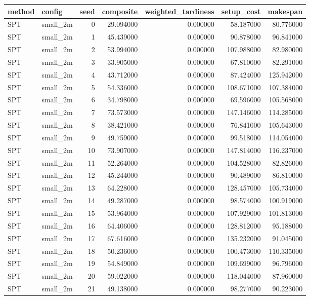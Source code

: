 \begin{tabular}{llrrrrr}
\toprule
method & config & seed & composite & weighted_tardiness & setup_cost & makespan \\
\midrule
SPT & small_2m & 0 & 29.094000 & 0.000000 & 58.187000 & 80.776000 \\
SPT & small_2m & 1 & 45.439000 & 0.000000 & 90.878000 & 96.841000 \\
SPT & small_2m & 2 & 53.994000 & 0.000000 & 107.988000 & 82.980000 \\
SPT & small_2m & 3 & 33.905000 & 0.000000 & 67.810000 & 82.291000 \\
SPT & small_2m & 4 & 43.712000 & 0.000000 & 87.424000 & 125.942000 \\
SPT & small_2m & 5 & 54.336000 & 0.000000 & 108.671000 & 107.384000 \\
SPT & small_2m & 6 & 34.798000 & 0.000000 & 69.596000 & 105.568000 \\
SPT & small_2m & 7 & 73.573000 & 0.000000 & 147.146000 & 114.285000 \\
SPT & small_2m & 8 & 38.421000 & 0.000000 & 76.841000 & 105.643000 \\
SPT & small_2m & 9 & 49.759000 & 0.000000 & 99.518000 & 114.054000 \\
SPT & small_2m & 10 & 73.907000 & 0.000000 & 147.814000 & 116.237000 \\
SPT & small_2m & 11 & 52.264000 & 0.000000 & 104.528000 & 82.826000 \\
SPT & small_2m & 12 & 45.244000 & 0.000000 & 90.489000 & 86.810000 \\
SPT & small_2m & 13 & 64.228000 & 0.000000 & 128.457000 & 105.734000 \\
SPT & small_2m & 14 & 49.287000 & 0.000000 & 98.574000 & 100.919000 \\
SPT & small_2m & 15 & 53.964000 & 0.000000 & 107.929000 & 101.813000 \\
SPT & small_2m & 16 & 64.406000 & 0.000000 & 128.812000 & 95.188000 \\
SPT & small_2m & 17 & 67.616000 & 0.000000 & 135.232000 & 91.045000 \\
SPT & small_2m & 18 & 50.236000 & 0.000000 & 100.473000 & 110.335000 \\
SPT & small_2m & 19 & 54.849000 & 0.000000 & 109.699000 & 96.796000 \\
SPT & small_2m & 20 & 59.022000 & 0.000000 & 118.044000 & 87.960000 \\
SPT & small_2m & 21 & 49.138000 & 0.000000 & 98.277000 & 90.223000 \\

\end{tabular}

